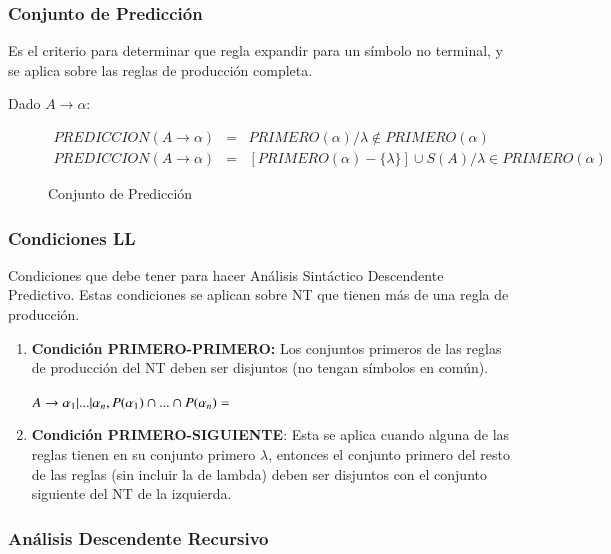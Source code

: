 \documentclass[12pt, twoside, openright]{report} %
\begin{document}
\subsubsection{Conjunto de Predicción}

Es el criterio para determinar que regla expandir para un símbolo no
terminal, y se aplica sobre las reglas de producción completa.

Dado \(A \rightarrow \alpha\):

\begin{figure}[H]
 \begin{eqnarray*}
    PREDICCION(A \rightarrow \alpha) &=& PRIMERO(\alpha) / \lambda \notin PRIMERO(\alpha) \\
    PREDICCION(A \rightarrow \alpha) &=& [PRIMERO(\alpha)-\{\lambda\}] \cup S(A) / \lambda \in PRIMERO(\alpha)
 \end{eqnarray*}

  \captionsetup{justification=centering}
  \caption{Conjunto de Predicción}
\end{figure}

\pagebreak
\subsubsection{Condiciones LL}

Condiciones que debe tener para hacer Análisis Sintáctico Descendente
Predictivo.
Estas condiciones se aplican sobre NT que tienen más de una regla de
producción.

\begin{enumerate}
\def\labelenumi{\arabic{enumi}.}

\item
  \textbf{Condición PRIMERO-PRIMERO:} Los conjuntos primeros de las
  reglas de producción del NT deben ser disjuntos (no tengan símbolos en
  común).

  \(A \rightarrow \alpha_1 |...|\alpha_n, P(\alpha_1) \cap ... \cap P(\alpha_n) = \empty\)
\item
  \textbf{Condición PRIMERO-SIGUIENTE}: Esta se aplica cuando alguna de
  las reglas tienen en su conjunto primero \(\lambda\), entonces el
  conjunto primero del resto de las reglas (sin incluir la de lambda)
  deben ser disjuntos con el conjunto siguiente del NT de la izquierda.
\end{enumerate}


\subsubsection{Análisis Descendente Recursivo}
\end{document}
